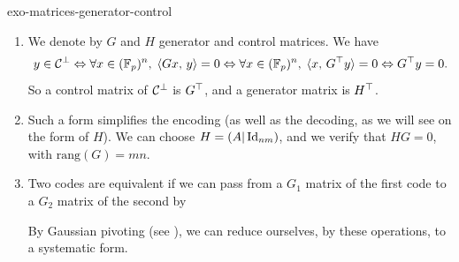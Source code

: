  
\begin{correction}{exo-matrices-generator-control}
\begin{enumerate}
\item We denote by $ G $ and $ H $ generator and control matrices. We have
\begin{equation*}
y \in \mathcal{C}^\bot \Leftrightarrow \forall x \in (\mathbb{F}_p)^n, \; \langle G x,\,y\rangle = 0 \Leftrightarrow \forall x \in (\mathbb{F}_p)^n, \; \langle x,\,G^\top y\rangle = 0 \Leftrightarrow G^\top y = 0.
\end{equation*}
So a control matrix of $ \mathcal{C}^\bot $ is $ G^\top $, and a generator matrix is $ H^\top $.
\item Such a form simplifies the encoding (as well as the decoding, as we will see on the form of $ H $). We can choose $ H = (A | \operatorname{Id}_{nm}) $, and we verify that $ HG = 0 $, with $ \text{rang} (G) = mn $.
\item Two codes are equivalent if we can pass from a $ G_1 $ matrix of the first code to a $ G_2 $ matrix of the second by   By Gaussian pivoting (see \cite{ciarlet}), we can reduce ourselves, by these operations, to a systematic form.
\end{enumerate}
\end{correction}
 
